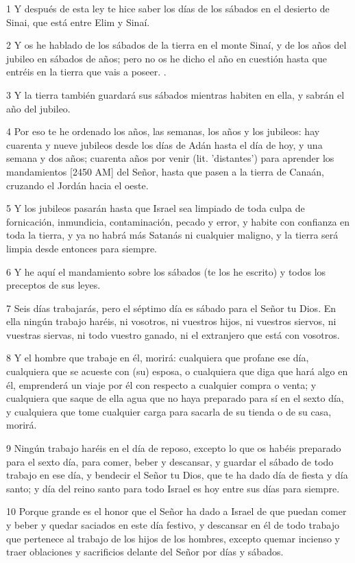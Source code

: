 \par 1 Y después de esta ley te hice saber los días de los sábados en el desierto de Sinai, que está entre Elim y Sinaí.
\par 2 Y os he hablado de los sábados de la tierra en el monte Sinaí, y de los años del jubileo en sábados de años; pero no os he dicho el año en cuestión hasta que entréis en la tierra que vais a poseer. .
\par 3 Y la tierra también guardará sus sábados mientras habiten en ella, y sabrán el año del jubileo.
\par 4 Por eso te he ordenado los años, las semanas, los años y los jubileos: hay cuarenta y nueve jubileos desde los días de Adán hasta el día de hoy, y una semana y dos años; cuarenta años por venir (lit. 'distantes') para aprender los mandamientos [2450 AM] del Señor, hasta que pasen a la tierra de Canaán, cruzando el Jordán hacia el oeste.
\par 5 Y los jubileos pasarán hasta que Israel sea limpiado de toda culpa de fornicación, inmundicia, contaminación, pecado y error, y habite con confianza en toda la tierra, y ya no habrá más Satanás ni cualquier maligno, y la tierra será limpia desde entonces para siempre.
\par 6 Y he aquí el mandamiento sobre los sábados (te los he escrito) y todos los preceptos de sus leyes.
\par 7 Seis días trabajarás, pero el séptimo día es sábado para el Señor tu Dios. En ella ningún trabajo haréis, ni vosotros, ni vuestros hijos, ni vuestros siervos, ni vuestras siervas, ni todo vuestro ganado, ni el extranjero que está con vosotros.
\par 8 Y el hombre que trabaje en él, morirá: cualquiera que profane ese día, cualquiera que se acueste con (su) esposa, o cualquiera que diga que hará algo en él, emprenderá un viaje por él con respecto a cualquier compra o venta; y cualquiera que saque de ella agua que no haya preparado para sí en el sexto día, y cualquiera que tome cualquier carga para sacarla de su tienda o de su casa, morirá.
\par 9 Ningún trabajo haréis en el día de reposo, excepto lo que os habéis preparado para el sexto día, para comer, beber y descansar, y guardar el sábado de todo trabajo en ese día, y bendecir el Señor tu Dios, que te ha dado día de fiesta y día santo; y día del reino santo para todo Israel es hoy entre sus días para siempre.
\par 10 Porque grande es el honor que el Señor ha dado a Israel de que puedan comer y beber y quedar saciados en este día festivo, y descansar en él de todo trabajo que pertenece al trabajo de los hijos de los hombres, excepto quemar incienso y traer oblaciones y sacrificios delante del Señor por días y sábados.
